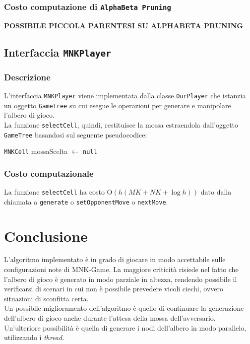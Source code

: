 \documentclass[11pt]{article}
\begin{document}
\subsubsection*{Costo computazione di \texttt{AlphaBeta Pruning}}
\textbf{POSSIBILE PICCOLA PARENTESI SU ALPHABETA PRUNING}

\newpage
\subsection*{Interfaccia \texttt{MNKPlayer}}
\subsubsection*{Descrizione}
L'interfaccia \texttt{MNKPlayer} viene implementata dalla classe \texttt{OurPlayer} che istanzia un oggetto \texttt{GameTree} su cui esegue le operazioni per generare e manipolare l'albero di gioco.\\
La funzione \texttt{selectCell}, quindi, restituisce la mossa estraendola dall'oggetto \texttt{GameTree} basandosi sul seguente pseudocodice:
\begin{algorithm*}
\SetAlgoLined
\texttt{MNKCell} mossaScelta $\gets$ \texttt{null}\\
\vspace{0.2cm}
\end{algorithm*}
\subsubsection*{Costo computazionale}
La funzione \texttt{selectCell} ha costo O$(h(MK+NK+\log h))$ dato dalla chiamata a \texttt{generate} o \texttt{setOpponentMove} o \texttt{nextMove}.

\section*{Conclusione}
L'algoritmo implementato è in grado di giocare in modo accettabile sulle configurazioni note di MNK-Game. La maggiore criticità risiede nel fatto che l'albero di gioco è generato in modo parziale in altezza, rendendo possibile il verificarsi di scenari in cui non è possibile prevedere vicoli ciechi, ovvero situazioni di sconfitta certa.\\
Un possibile miglioramento dell'algoritmo è quello di continuare la generazione dell'albero di gioco anche durante l'attesa della mossa dell'avversario.\\
Un'ulteriore possibilità è quella di generare i nodi dell'albero in modo parallelo, utilizzando i \textit{thread}.
\end{document}
